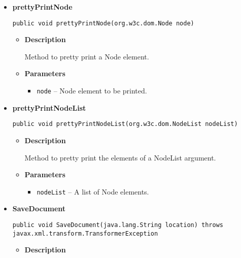 \documentclass[11pt,a4paper]{report}
\begin{document}
{{{{{{\begin{itemize}
{\begin{itemize}
{Method which returns the parsed XML document.
}
\item{{\bf  Returns} -- 
Return the parsed XML document. 
}%
\end{itemize}
}%
\item{ 
\hypertarget{core.Interactor.prettyPrintNode(org.w3c.dom.Node)}{{\bf  prettyPrintNode}\\}
\begin{lstlisting}[frame=none]
public void prettyPrintNode(org.w3c.dom.Node node)\end{lstlisting} %
\begin{itemize}
\item{
{\bf  Description}

Method to pretty print a Node element.
}
\item{
{\bf  Parameters}
  \begin{itemize}
   \item{
\texttt{node} -- Node element to be printed.}
  \end{itemize}
}%
\end{itemize}
}%
\item{ 
\hypertarget{core.Interactor.prettyPrintNodeList(org.w3c.dom.NodeList)}{{\bf  prettyPrintNodeList}\\}
\begin{lstlisting}[frame=none]
public void prettyPrintNodeList(org.w3c.dom.NodeList nodeList)\end{lstlisting} %
\begin{itemize}
\item{
{\bf  Description}

Method to pretty print the elements of a NodeList argument.
}
\item{
{\bf  Parameters}
  \begin{itemize}
   \item{
\texttt{nodeList} -- A list of Node elements.}
  \end{itemize}
}%
\end{itemize}
}%
\item{ 
\hypertarget{core.Interactor.SaveDocument(java.lang.String)}{{\bf  SaveDocument}\\}
\begin{lstlisting}[frame=none]
public void SaveDocument(java.lang.String location) throws javax.xml.transform.TransformerException\end{lstlisting} %
\begin{itemize}
\item{
{\bf  Description}

}
\end{itemize}}
\end{itemize}}}}}}}
\end{document}
